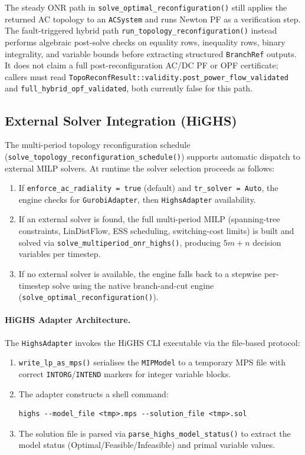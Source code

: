 The steady ONR path in \texttt{solve\_optimal\_reconfiguration()} still applies
the returned AC topology to an \texttt{ACSystem} and runs Newton PF as a
verification step.  The fault-triggered hybrid path
\texttt{run\_topology\_reconfiguration()} instead performs algebraic post-solve
checks on equality rows, inequality rows, binary integrality, and variable
bounds before extracting structured \texttt{BranchRef} outputs.  It does not
claim a full post-reconfiguration AC/DC PF or OPF certificate; callers must read
\texttt{TopoReconfResult::validity.post\_power\_flow\_validated} and
\texttt{full\_hybrid\_opf\_validated}, both currently false for this path.

\subsection{External Solver Integration (HiGHS)}
\label{sec:onr_highs}

The multi-period topology reconfiguration schedule
(\texttt{solve\_topology\_reconfiguration\_schedule()}) supports
automatic dispatch to external MILP solvers.  At runtime the solver selection
proceeds as follows:

\begin{enumerate}
  \item If \texttt{enforce\_ac\_radiality = true} (default) and
        \texttt{tr\_solver = Auto}, the engine checks for
        \texttt{GurobiAdapter}, then \texttt{HighsAdapter} availability.
  \item If an external solver is found, the full multi-period MILP (spanning-tree
        constraints, LinDistFlow, ESS scheduling, switching-cost limits) is
        built and solved via \texttt{solve\_multiperiod\_onr\_highs()}, producing
        $5m + n$ decision variables per timestep.
  \item If no external solver is available, the engine falls back to a
        stepwise per-timestep solve using the native branch-and-cut engine
        (\texttt{solve\_optimal\_reconfiguration()}).
\end{enumerate}

\paragraph{HiGHS Adapter Architecture.}
The \texttt{HighsAdapter} invokes the HiGHS CLI executable via the file-based
protocol:
\begin{enumerate}
  \item \texttt{write\_lp\_as\_mps()} serialises the \texttt{MIPModel} to a
        temporary MPS file with correct \texttt{INTORG}/\texttt{INTEND} markers
        for integer variable blocks.
  \item The adapter constructs a shell command:
\begin{verbatim}
highs --model_file <tmp>.mps --solution_file <tmp>.sol
\end{verbatim}
  \item The solution file is parsed via \texttt{parse\_highs\_model\_status()}
        to extract the model status (Optimal/Feasible/Infeasible) and primal
        variable values.
\end{enumerate}

